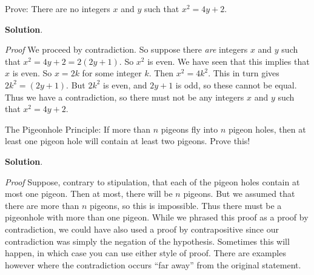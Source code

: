 \documentclass[11pt,]{book}
\makeatletter
\theoremstyle{ptxplainnotitle}
\theoremstyle{ptxplaintitle}
\renewcommand*{\proofname}{Proof}
\renewenvironment{proof}[1][\proofname]{\par
  \pushQED{\qed}%
  \normalfont \topsep6\p@\@plus6\p@\relax
  \trivlist
  \item\relax
    {\itshape
    #1\@addpunct{.}}\hspace\labelsep\ignorespaces
}{%
  \popQED\endtrivlist\@endpefalse
}
\theoremstyle{ptxdefinitionnotitle}
\theoremstyle{ptxdefinitiontitle}
\theoremstyle{ptxdefinitionnotitle}
\theoremstyle{ptxdefinitiontitle}
\theoremstyle{ptxdefinitionnotitle}
\theoremstyle{ptxdefinitiontitle}
\theoremstyle{ptxdefinitiontitlenonumber}
\theoremstyle{ptxdefinitiontitlenonumber}
\numberwithin{equation}{chapter}
\makeatother
\begin{document}
\begin{example}\label{example-69}
\hypertarget{p-2576}{}%
Prove: There are no integers \(x\) and \(y\) such that \(x^2  = 4y + 2\).%
\par\smallskip%
\noindent\textbf{Solution}.\hypertarget{solution-293}{}\quad%
\begin{proof}\hypertarget{proof-31}{}
\hypertarget{p-2577}{}%
We proceed by contradiction. So suppose there \emph{are} integers \(x\) and \(y\) such that \(x^2 = 4y + 2 = 2(2y + 1)\). So \(x^2\) is even. We have seen that this implies that \(x\) is even. So \(x = 2k\) for some integer \(k\). Then \(x^2 = 4k^2\). This in turn gives \(2k^2 = (2y + 1)\). But \(2k^2\) is even, and \(2y + 1\) is odd, so these cannot be equal. Thus we have a contradiction, so there must not be any integers \(x\) and \(y\) such that \(x^2 = 4y + 2\).%
\end{proof}
\end{example}
\begin{example}\label{example-70}
\hypertarget{p-2578}{}%
The Pigeonhole Principle: If more than \(n\) pigeons fly into \(n\) pigeon holes, then at least one pigeon hole will contain at least two pigeons. Prove this!%
\par\smallskip%
\noindent\textbf{Solution}.\hypertarget{solution-294}{}\quad%
\begin{proof}\hypertarget{proof-32}{}
\hypertarget{p-2579}{}%
Suppose, contrary to stipulation, that each of the pigeon holes contain at most one pigeon. Then at most, there will be \(n\) pigeons. But we assumed that there are more than \(n\) pigeons, so this is impossible. Thus there must be a pigeonhole with more than one pigeon.%
\end{proof}
\hypertarget{p-2580}{}%
While we phrased this proof as a proof by contradiction, we could have also used a proof by contrapositive since our contradiction was simply the negation of the hypothesis. Sometimes this will happen, in which case you can use either style of proof. There are examples however where the contradiction occurs ``far away'' from the original statement.%
\end{example}
\typeout{************************************************}
\typeout{************************************************}
\end{document}
